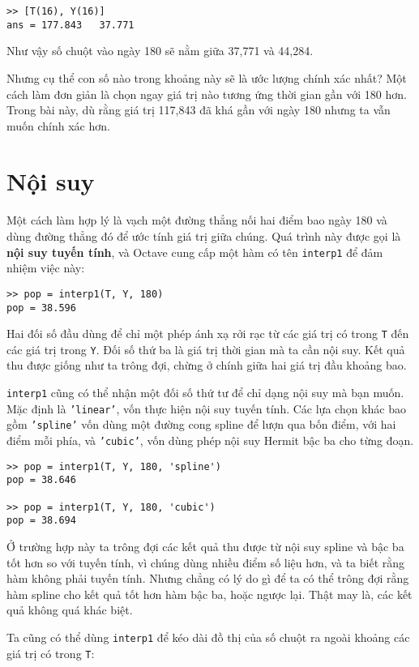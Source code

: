 \documentclass[12pt]{book}
\begin{document}
\begin{verbatim}
>> [T(16), Y(16)]
ans = 177.843   37.771
\end{verbatim}
%   
Như vậy số chuột vào ngày 180 sẽ nằm giữa  37,771 và  44,284.

Nhưng cụ thể con số nào trong khoảng này sẽ là ước lượng chính xác nhất?
Một cách làm đơn giản là chọn ngay giá trị nào tương ứng thời gian gần với 
180 hơn. Trong bài này, dù rằng giá trị 117,843 đã khá gần với ngày 180 
nhưng ta vẫn muốn chính xác hơn.


\section{Nội suy}

Một cách làm hợp lý là vạch một đường thẳng nối hai điểm bao ngày 180
và dùng đường thẳng đó để ước tính giá trị giữa chúng. Quá trình này được 
gọi là {\bf nội suy tuyến tính}, và Octave cung cấp một hàm có tên 
{\tt interp1} để đảm nhiệm việc này:

\begin{verbatim}
>> pop = interp1(T, Y, 180)
pop = 38.596
\end{verbatim}
%
Hai đối số đầu dùng để chỉ một phép ánh xạ rởi rạc từ các giá trị có 
trong {\tt T} đến các giá trị trong  {\tt Y}.  Đối số thứ ba là giá trị thời gian 
mà ta cần nội suy. Kết quả thu được giống như ta trông đợi, chừng ở chính  giữa 
hai giá trị đầu khoảng bao. 

{\tt interp1} cũng có thể nhận một đối số thứ tư để chỉ dạng nội suy mà bạn muốn.
Mặc định là {\tt 'linear'}, vốn thực hiện nội suy tuyến tính. Các lựa chọn khác bao 
gồm {\tt 'spline'} vốn dùng một đường cong spline để lượn qua bốn điểm, với hai 
điểm mỗi phía, và {\tt 'cubic'}, vốn dùng phép nội suy Hermit bậc ba cho 
từng đoạn.

\begin{verbatim}
>> pop = interp1(T, Y, 180, 'spline')
pop = 38.646

>> pop = interp1(T, Y, 180, 'cubic')
pop = 38.694
\end{verbatim}
%
Ở trường hợp này ta trông đợi các kết quả thu được từ nội suy spline 
và bậc ba tốt hơn so với tuyến tính, vì chúng dùng nhiều điểm số liệu hơn, 
và ta biết rằng hàm không phải tuyến tính. Nhưng chẳng có lý do gì để ta 
có thể trông đợi rằng hàm spline cho kết quả tốt hơn hàm bậc ba, hoặc 
ngược lại. Thật may là, các kết quả không quá khác biệt. 

Ta cũng có thể dùng  {\tt interp1} để kéo dài đồ thị của số chuột ra 
ngoài khoảng các giá trị có trong {\tt T}:
\end{document}
